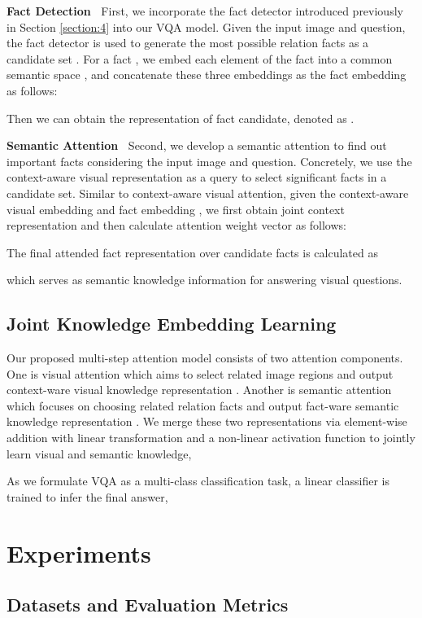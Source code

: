 \documentclass[sigconf]{acmart}
\begin{document}
\textbf{Fact Detection~} First, we incorporate the fact detector introduced previously in Section \ref{section:4} into our VQA model. Given the input image and question, the fact detector is used to generate the most possible  relation facts as a candidate set . For a fact , we embed each element of the fact into a common semantic space , and concatenate these three embeddings as the fact embedding as follows:

Then we can obtain the representation of  fact candidate, denoted as .

\textbf{Semantic Attention~} Second, we develop a semantic attention to find out important facts considering the input image and question. Concretely, we use the context-aware visual representation as a query to select significant facts in a candidate set. Similar to context-aware visual attention, given the context-aware visual embedding  and fact embedding , we first obtain joint context representation  and
then calculate attention weight vector  as follows:	

The final attended fact representation over candidate facts is calculated as

which serves as semantic knowledge information for answering visual questions.


\subsection{Joint Knowledge Embedding Learning} \label{subsection:53}
Our proposed multi-step attention model consists of two attention components. One is visual attention which aims to select related image regions and output context-ware visual knowledge representation . Another is semantic attention which focuses on choosing related relation facts and output fact-ware semantic knowledge representation . We merge these two representations via element-wise addition with linear transformation and a non-linear
activation function to jointly learn visual and semantic knowledge, 

As we formulate VQA as a multi-class classification task, a linear classifier is trained to infer the final answer, 






\section{Experiments}
\subsection{Datasets and Evaluation Metrics}
\end{document}

